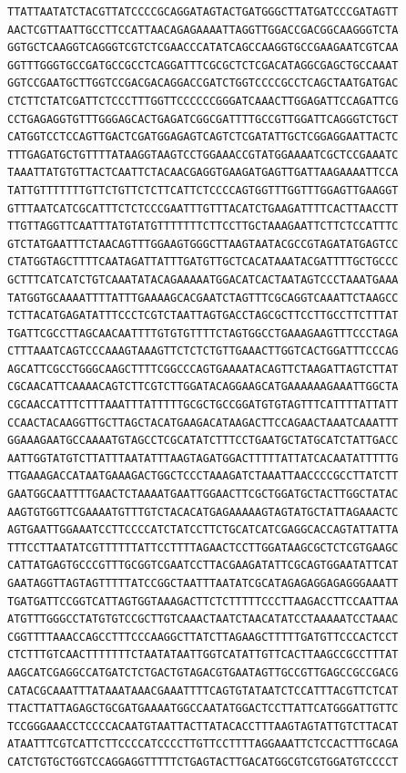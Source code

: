 \documentclass[a4paper]{article}
\begin{document}
\begin{verbatim}
TTATTAATATCTACGTTATCCCCGCAGGATAGTACTGATGGGCTTATGATCCCGATAGTT
AACTCGTTAATTGCCTTCCATTAACAGAGAAAATTAGGTTGGACCGACGGCAAGGGTCTA
GGTGCTCAAGGTCAGGGTCGTCTCGAACCCATATCAGCCAAGGTGCCGAAGAATCGTCAA
GGTTTGGGTGCCGATGCCGCCTCAGGATTTCGCGCTCTCGACATAGGCGAGCTGCCAAAT
GGTCCGAATGCTTGGTCCGACGACAGGACCGATCTGGTCCCCGCCTCAGCTAATGATGAC
CTCTTCTATCGATTCTCCCTTTGGTTCCCCCCGGGATCAAACTTGGAGATTCCAGATTCG
CCTGAGAGGTGTTTGGGAGCACTGAGATCGGCGATTTTGCCGTTGGATTCAGGGTCTGCT
CATGGTCCTCCAGTTGACTCGATGGAGAGTCAGTCTCGATATTGCTCGGAGGAATTACTC
TTTGAGATGCTGTTTTATAAGGTAAGTCCTGGAAACCGTATGGAAAATCGCTCCGAAATC
TAAATTATGTGTTACTCAATTCTACAACGAGGTGAAGATGAGTTGATTAAGAAAATTCCA
TATTGTTTTTTTGTTCTGTTCTCTTCATTCTCCCCAGTGGTTTGGTTTGGAGTTGAAGGT
GTTTAATCATCGCATTTCTCTCCCGAATTTGTTTACATCTGAAGATTTTCACTTAACCTT
TTGTTAGGTTCAATTTATGTATGTTTTTTTCTTCCTTGCTAAAGAATTCTTCTCCATTTC
GTCTATGAATTTCTAACAGTTTGGAAGTGGGCTTAAGTAATACGCCGTAGATATGAGTCC
CTATGGTAGCTTTTCAATAGATTATTTGATGTTGCTCACATAAATACGATTTTGCTGCCC
GCTTTCATCATCTGTCAAATATACAGAAAAATGGACATCACTAATAGTCCCTAAATGAAA
TATGGTGCAAAATTTTATTTGAAAAGCACGAATCTAGTTTCGCAGGTCAAATTCTAAGCC
TCTTACATGAGATATTTCCCTCGTCTAATTAGTGACCTAGCGCTTCCTTGCCTTCTTTAT
TGATTCGCCTTAGCAACAATTTTGTGTGTTTTCTAGTGGCCTGAAAGAAGTTTCCCTAGA
CTTTAAATCAGTCCCAAAGTAAAGTTCTCTCTGTTGAAACTTGGTCACTGGATTTCCCAG
AGCATTCGCCTGGGCAAGCTTTTCGGCCCAGTGAAAATACAGTTCTAAGATTAGTCTTAT
CGCAACATTCAAAACAGTCTTCGTCTTGGATACAGGAAGCATGAAAAAAGAAATTGGCTA
CGCAACCATTTCTTTAAATTTATTTTTGCGCTGCCGGATGTGTAGTTTCATTTTATTATT
CCAACTACAAGGTTGCTTAGCTACATGAAGACATAAGACTTCCAGAACTAAATCAAATTT
GGAAAGAATGCCAAAATGTAGCCTCGCATATCTTTCCTGAATGCTATGCATCTATTGACC
AATTGGTATGTCTTATTTAATATTTAAGTAGATGGACTTTTTATTATCACAATATTTTTG
TTGAAAGACCATAATGAAAGACTGGCTCCCTAAAGATCTAAATTAACCCCGCCTTATCTT
GAATGGCAATTTTGAACTCTAAAATGAATTGGAACTTCGCTGGATGCTACTTGGCTATAC
AAGTGTGGTTCGAAAATGTTTGTCTACACATGAGAAAAAGTAGTATGCTATTAGAAACTC
AGTGAATTGGAAATCCTTCCCCATCTATCCTTCTGCATCATCGAGGCACCAGTATTATTA
TTTCCTTAATATCGTTTTTTATTCCTTTTAGAACTCCTTGGATAAGCGCTCTCGTGAAGC
CATTATGAGTGCCCGTTTGCGGTCGAATCCTTACGAAGATATTCGCAGTGGAATATTCAT
GAATAGGTTAGTAGTTTTTATCCGGCTAATTTAATATCGCATAGAGAGGAGAGGGAAATT
TGATGATTCCGGTCATTAGTGGTAAAGACTTCTCTTTTTCCCTTAAGACCTTCCAATTAA
ATGTTTGGGCCTATGTGTCCGCTTGTCAAACTAATCTAACATATCCTAAAAATCCTAAAC
CGGTTTTAAACCAGCCTTTCCCAAGGCTTATCTTAGAAGCTTTTTGATGTTCCCACTCCT
CTCTTTGTCAACTTTTTTTCTAATATAATTGGTCATATTGTTCACTTAAGCCGCCTTTAT
AAGCATCGAGGCCATGATCTCTGACTGTAGACGTGAATAGTTGCCGTTGAGCCGCCGACG
CATACGCAAATTTATAAATAAACGAAATTTTCAGTGTATAATCTCCATTTACGTTCTCAT
TTACTTATTAGAGCTGCGATGAAAATGGCCAATATGGACTCCTTATTCATGGGATTGTTC
TCCGGGAAACCTCCCCACAATGTAATTACTTATACACCTTTAAGTAGTATTGTCTTACAT
ATAATTTCGTCATTCTTCCCCATCCCCTTGTTCCTTTTAGGAAATTCTCCACTTTGCAGA
CATCTGTGCTGGTCCAGGAGGTTTTTCTGAGTACTTGACATGGCGTCGTGGATGTCCCCT

\end{verbatim}
\end{document}
